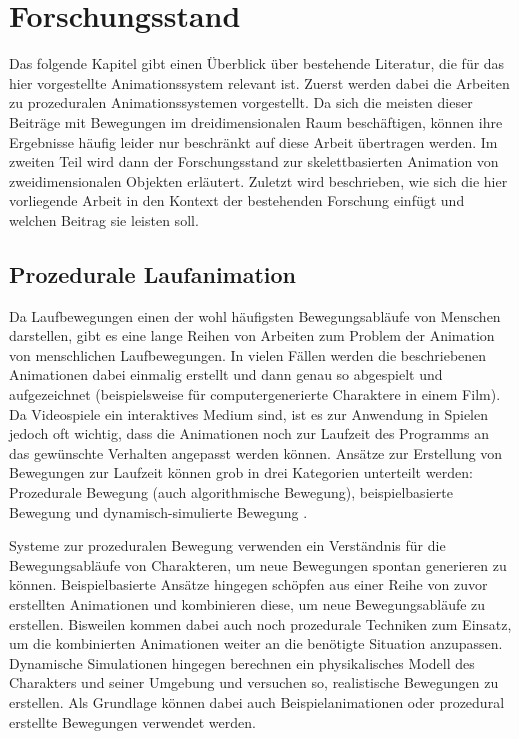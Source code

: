 \chapter{Forschungsstand} \label{forschungsstand}
Das folgende Kapitel gibt einen Überblick über bestehende Literatur, die für das hier vorgestellte Animationssystem relevant ist. Zuerst werden dabei die Arbeiten zu prozeduralen Animationssystemen vorgestellt. Da sich die meisten dieser Beiträge mit Bewegungen im dreidimensionalen Raum beschäftigen, können ihre Ergebnisse häufig leider nur beschränkt auf diese Arbeit übertragen werden. Im zweiten Teil wird dann der Forschungsstand zur skelettbasierten Animation von zweidimensionalen Objekten erläutert. Zuletzt wird beschrieben, wie sich die hier vorliegende Arbeit in den Kontext der bestehenden Forschung einfügt und welchen Beitrag sie leisten soll.


\section{Prozedurale Laufanimation}
Da Laufbewegungen einen der wohl häufigsten Bewegungsabläufe von Menschen darstellen, gibt es eine lange Reihen von Arbeiten zum Problem der Animation von menschlichen Laufbewegungen. In vielen Fällen werden die beschriebenen Animationen dabei einmalig erstellt und dann genau so abgespielt und aufgezeichnet (beispielsweise für computergenerierte Charaktere in einem Film). Da Videospiele ein interaktives Medium sind, ist es zur Anwendung in Spielen jedoch oft wichtig, dass die Animationen noch zur Laufzeit des Programms an das gewünschte Verhalten angepasst werden können. Ansätze zur Erstellung von Bewegungen zur Laufzeit können grob in drei Kategorien unterteilt werden: Prozedurale Bewegung (auch algorithmische Bewegung), beispielbasierte Bewegung und dynamisch-simulierte Bewegung \cite{johansen2009automated}.

Systeme zur prozeduralen Bewegung verwenden ein Verständnis für die Bewegungsabläufe von Charakteren, um neue Bewegungen spontan generieren zu können. Beispielbasierte Ansätze hingegen schöpfen aus einer Reihe von zuvor erstellten Animationen und kombinieren diese, um neue Bewegungsabläufe zu erstellen. Bisweilen kommen dabei auch noch prozedurale Techniken zum Einsatz, um die kombinierten Animationen weiter an die benötigte Situation anzupassen. Dynamische Simulationen hingegen berechnen ein physikalisches Modell des Charakters und seiner Umgebung und versuchen so, realistische Bewegungen zu erstellen. Als Grundlage können dabei auch Beispielanimationen oder prozedural erstellte Bewegungen verwendet werden.

